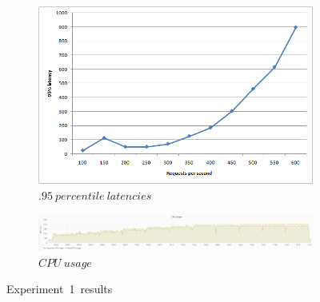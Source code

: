 \begin{figure}
\centering
\begin{subfigure}[b]{1\columnwidth}
         \centering
         \includegraphics[width=0.75\columnwidth]{Images/Results/Latencies-cas-li.png}
         \caption{$.95\ percentile\ latencies$}
         \label{fig:exp1lat}
\end{subfigure}
\hfill
\begin{subfigure}[b]{1\columnwidth}
         \centering
         \includegraphics[width=\columnwidth]{Images/Results/CPU-usage-cas-li.png}
         \caption{$CPU\ usage$}
         \label{fig:exp1cpu}
\end{subfigure}
\hfill
\label{figure:experiment1results}  
\caption{Experiment\ 1\ results}
\end{figure}